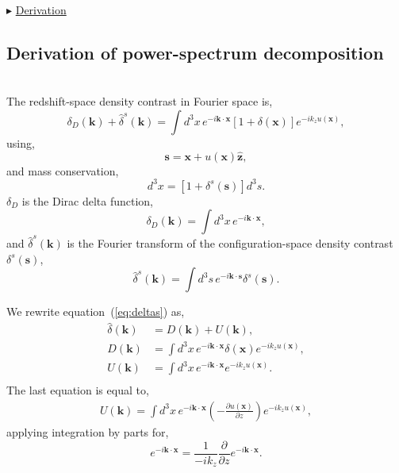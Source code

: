 \documentclass[a4paper,11pt, fleqn]{article}
\begin{document}
\vspace{10mm}
$\blacktriangleright$ \hyperlink{sec:decomposed-power-derivation}{Derivation}

%
\newpage
\subsection{Derivation of power-spectrum decomposition}
\label{sec:decomposed-power-derivation}\quad\\

The redshift-space density contrast in Fourier space is,
%
\begin{equation}
  \label{eq:deltas}
  \delta_D(\bm{k}) + \hat{\delta}^s(\bm{k}) = \int \! d^3 x \, e^{-i\bm{k}\cdot\bm{x}} [1 + \delta(\bm{x})] e^{-ik_z u(\bm{x})},
\end{equation}
%
using,
%
\begin{equation}
  \bm{s} = \bm{x} + u(\bm{x}) \hat{\bm{z}},
\end{equation}
%
and mass conservation,
%
\begin{equation}
  [1 + \delta(\bm{x})] d^3 x = [1 + \delta^s(\bm{s})] d^3 s.
\end{equation}
%
$\delta_D$ is the Dirac delta function,
%
\begin{equation}
  \delta_D(\bm{k}) = \int\! d^3 x \, e^{-i\bm{k}\cdot\bm{x}},
\end{equation}
and $\hat{\delta}^s(\bm{k})$ is the Fourier transform of the
configuration-space density contrast $\delta^s(\bm{s})$,
%
\begin{equation}
  \hat{\delta}^s(\bm{k}) = \int \! d^3 s \,
                           e^{-i\bm{k}\cdot\bm{s}} \delta^s(\bm{s}).
\end{equation}

\vspace{10mm}
We rewrite equation~(\ref{eq:deltas}) as,
%
\begin{align}
  \hat{\delta}(\bm{k}) &= D(\bm{k}) + U(\bm{k}),\\
  D(\bm{k}) &= \int \! d^3 x \, e^{-i\bm{k}\cdot\bm{x}} \delta(\bm{x})
               e^{-ik_z u(\bm{x})},\\
  U(\bm{k}) &= \int \! d^3 x \, e^{-i\bm{k}\cdot\bm{x}}
                              e^{-ik_z u(\bm{x})}.\\
\end{align}
%
The last equation is equal to,
%
\begin{equation}\begin{split}
  U(\bm{k}) = \int\! d^3 x \, e^{-i \bm{k}\cdot\bm{x}}
              \left( - \frac{\partial u(\bm{x})}{\partial z} \right)
              e^{-ik_z u(\bm{x})},
\end{split}\end{equation}
applying integration by parts for,
\begin{equation}
  e^{-i \bm{k}\cdot\bm{x}} = \frac{1}{-ik_z}
  \frac{\partial}{\partial z} e^{-i \bm{k}\cdot\bm{x}}.
\end{equation}
\end{document}
